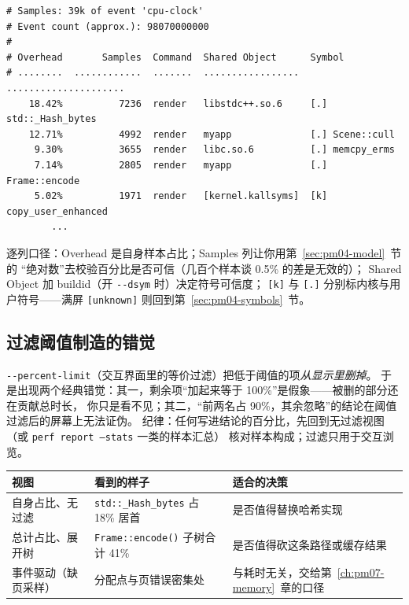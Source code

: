 \documentclass[12pt,a4paper,fontset=fandol]{ctexbook}
\newcommand{\Fn}[1]{\texttt{#1()}}
\newcommand{\Tp}[1]{\texttt{#1}}
\newcommand{\Opt}[1]{\texttt{-\/-#1}}
\newcommand{\Bk}{\discretionary{}{}{}}
\begin{document}
\begin{lstlisting}[style=outstyle, caption={示意输出（非本仓库实测值，仅为 perf report --stdio 的形态示例；数值、符号、库版本都是编造的占位）。}, label={lst:pm04-report}]
# Samples: 39k of event 'cpu-clock'
# Event count (approx.): 98070000000
#
# Overhead       Samples  Command  Shared Object      Symbol
# ........  ............  .......  .................  .....................
    18.42%          7236  render   libstdc++.so.6     [.] std::_Hash_bytes
    12.71%          4992  render   myapp              [.] Scene::cull
     9.30%          3655  render   libc.so.6          [.] memcpy_erms
     7.14%          2805  render   myapp              [.] Frame::encode
     5.02%          1971  render   [kernel.kallsyms]  [k] copy_user_enhanced
        ...
\end{lstlisting}

逐列口径：Overhead 是自身样本占比；Samples 列让你用第~\ref{sec:pm04-model}~节的
``绝对数''去校验百分比是否可信（几百个样本谈 0.5\% 的差是无效的）；
Shared Object 加 buildid（开 \Opt{dsym} 时）决定符号可信度；
\Tp{[k]} 与 \Tp{[.]} 分别标内核与用户符号——满屏 \Tp{[unknown]} 则回到第~\ref{sec:pm04-symbols}~节。

\subsection{过滤阈值制造的错觉}

\Opt{percent-limit}（交互界面里的等价过滤）把低于阈值的项\emph{从显示里删掉}。
于是出现两个经典错觉：其一，剩余项``加起来等于 100\%''是假象——被删的部分还在贡献总时长，
你只是看不见；其二，``前两名占 90\%，其余忽略''的结论在阈值过滤后的屏幕上无法证伪。
纪律：任何写进结论的百分比，先回到无过滤视图（或 \Tp{perf report --stats} 一类的样本汇总）
核对样本构成；过滤只用于交互浏览。

\begin{compare}[title={同一份数据，三种口径三种决策}]
\begin{tabular}{>{\raggedright\arraybackslash}p{} >{\raggedright\arraybackslash}p{} >{\raggedright\arraybackslash}p{}}
视图 & 看到的样子 & 适合的决策 \\ \hline
自身占比、无过滤 & \Tp{std::{\Bk}\_Hash{\Bk}\_bytes} 占 18\% 居首 & 是否值得替换哈希实现 \\
总计占比、展开树 & \Fn{Frame::encode} 子树合计 41\% & 是否值得砍这条路径或缓存结果 \\
事件驱动（缺页采样）& 分配点与页错误密集处 & 与耗时无关，交给第~\ref{ch:pm07-memory}~章的口径 \\
\end{tabular}
\end{compare}
\end{document}
